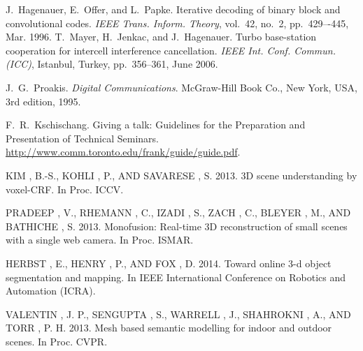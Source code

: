 \documentclass{llncs}
\begin{document}

\begin{thebibliography}{1}

	J.~Hagenauer, E.~Offer, and L.~Papke. Iterative decoding of binary block
	and convolutional codes. {\em IEEE Trans. Inform. Theory},
	vol.~42, no.~2, pp.~429–-445, Mar. 1996.
	T.~Mayer, H.~Jenkac, and J.~Hagenauer. Turbo base-station cooperation for intercell interference cancellation. {\em IEEE Int. Conf. Commun. (ICC)}, Istanbul, Turkey, pp.~356--361, June 2006.

	J.~G.~Proakis. {\em Digital Communications}. McGraw-Hill Book Co.,
	New York, USA, 3rd edition, 1995.

	F.~R.~Kschischang. Giving a talk: Guidelines for the Preparation and Presentation of Technical Seminars.
	\url{http://www.comm.toronto.edu/frank/guide/guide.pdf}.

	KIM , B.-S., KOHLI , P., AND SAVARESE , S. 2013. 3D scene understanding by voxel-CRF. In Proc. ICCV.
	
	PRADEEP , V., RHEMANN , C., IZADI , S., ZACH , C., BLEYER , M., AND BATHICHE , S. 2013. Monofusion: Real-time 3D reconstruction of small scenes with a single web camera. In Proc. ISMAR.
	
	HERBST , E., HENRY , P., AND FOX , D. 2014. Toward online 3-d object segmentation and mapping. In IEEE International Conference on Robotics and Automation (ICRA).
	
	VALENTIN , J. P., SENGUPTA , S., WARRELL , J., SHAHROKNI , A., AND TORR , P. H. 2013. Mesh based semantic modelling for indoor and outdoor scenes. In Proc. CVPR.
	
\end{thebibliography}

\end{document}
